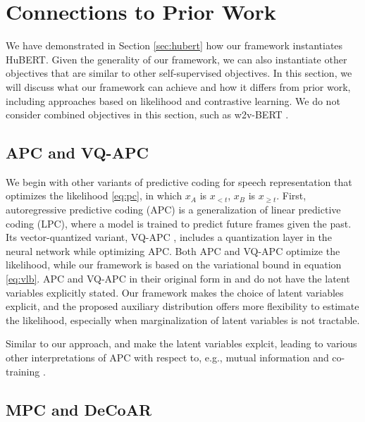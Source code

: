 \section{Connections to Prior Work}
\label{sec:related}

We have demonstrated in Section \ref{sec:hubert} how our framework
instantiates HuBERT.
Given the generality of our framework, we can also instantiate other objectives that are similar to other self-supervised objectives.
In this section, we will discuss what our framework can achieve and how it differs from prior work,
including approaches based on likelihood and contrastive learning.
We do not consider combined objectives in this section, such as
w2v-BERT \citep{chung2021w2v}.
%
%

\subsection{APC and VQ-APC}

We begin with other variants of predictive coding for speech representation that optimizes the likelihood
\eqref{eq:pc}, in which $x_A$ is $x_{<t}$, $x_B$ is $x_{\geq t}$.
First, autoregressive predictive coding \citep{chung2019unsupervised,yang2022autoregressive} (APC) is a generalization of linear predictive coding \citep{atal1971speech,saito1967theoretical} (LPC), 
where a model is trained to predict future frames given the past.
Its vector-quantized variant, VQ-APC \citep{chung2020vector}, 
includes a quantization layer in the neural network while optimizing APC.
Both APC and VQ-APC optimize the likelihood, while our framework is based on the variational bound in equation \ref{eq:vlb}.
APC and VQ-APC in their original form in \citet{chung2019unsupervised} and \citet{chung2020vector} do not have the latent variables explicitly stated.
Our framework makes the choice of latent variables explicit, and the proposed auxiliary distribution 
offers more flexibility to estimate the likelihood, especially when marginalization of 
latent variables is not tractable.

Similar to our approach, \citet{yang2022autoregressive} and \citet{yeh2022autoregressive} make the latent variables explcit, leading to various other interpretations of APC with respect to, e.g., mutual information and co-training \citep{mcallester2018information}.

\subsection{MPC and DeCoAR}

